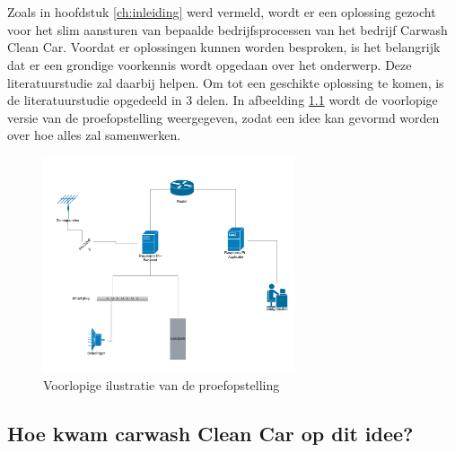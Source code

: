 \chapter{}%
\label{ch:stand-van-zaken}



Zoals in hoofdstuk \ref{ch:inleiding} werd vermeld, wordt er een oplossing gezocht voor het slim aansturen van bepaalde bedrijfsprocessen van het bedrijf Carwash Clean Car. Voordat er oplossingen kunnen worden besproken, is het belangrijk dat er een grondige voorkennis wordt opgedaan over het onderwerp. Deze literatuurstudie zal daarbij helpen. Om tot een geschikte oplossing te komen, is de literatuurstudie opgedeeld in 3 delen. In afbeelding \ref{fig:voorlopige-proefopstelling} wordt de voorlopige versie van de proefopstelling weergegeven, zodat een idee kan gevormd worden over hoe alles zal samenwerken.

\begin{figure}[htbp]
    \centering
    \includegraphics[width=20em]{./graphics/voorlopige-proefopstelling.png}
    \caption{Voorlopige ilustratie van de proefopstelling}
     \label{fig:voorlopige-proefopstelling}
\end{figure}

\pagebreak

\section{Hoe kwam carwash Clean Car op dit idee?}
\label{sec:stand-van-zaken-idee}

